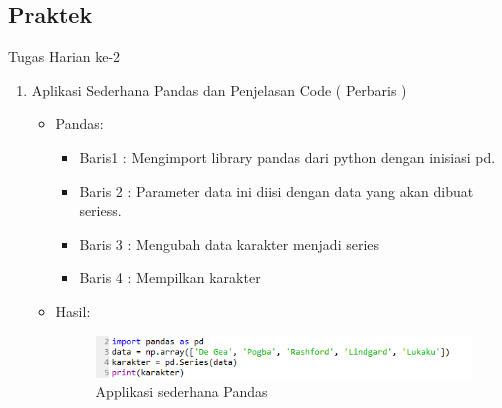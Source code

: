 \subsection{Praktek}
Tugas Harian ke-2
\begin{enumerate}
\item Aplikasi Sederhana Pandas dan Penjelasan Code ( Perbaris )
\begin{itemize}
\item Pandas:
\par 
\par
\begin{itemize}
\item Baris1 :  Mengimport library pandas dari python dengan inisiasi pd.
\par
\item Baris 2 : Parameter data ini diisi dengan data yang akan dibuat seriess.
\par
\item Baris 3 : Mengubah data karakter menjadi series
\par
\item Baris 4 : Mempilkan karakter
\par
\end{itemize}
\item Hasil:
\par
\par
\begin{figure}[ht]
\centering
\includegraphics[scale=0.8]{figures/hmm/1.png}
\caption{Applikasi sederhana Pandas}
\label{contoh}
\end{figure}
\par


\end{itemize}
\end{enumerate}
